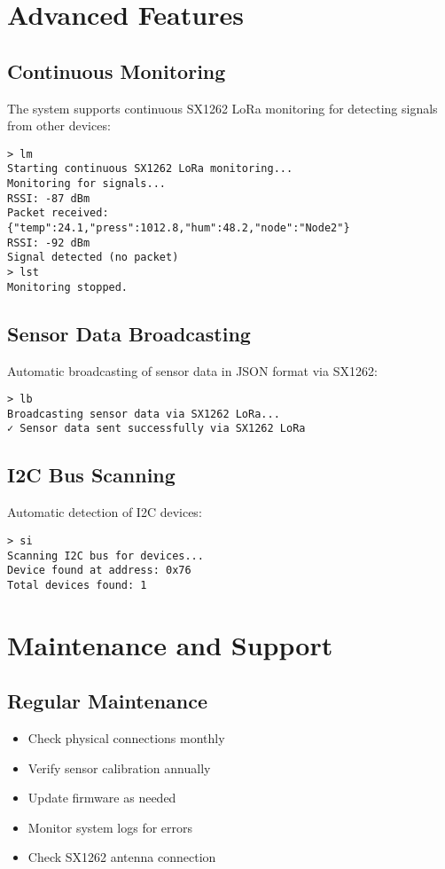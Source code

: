 \documentclass[11pt,a4paper]{article}
\begin{document}
\section{Advanced Features}

\subsection{Continuous Monitoring}
The system supports continuous SX1262 LoRa monitoring for detecting signals from other devices:

\begin{lstlisting}[caption=Continuous Monitoring]
> lm
Starting continuous SX1262 LoRa monitoring...
Monitoring for signals...
RSSI: -87 dBm
Packet received: {"temp":24.1,"press":1012.8,"hum":48.2,"node":"Node2"}
RSSI: -92 dBm
Signal detected (no packet)
> lst
Monitoring stopped.
\end{lstlisting}

\subsection{Sensor Data Broadcasting}
Automatic broadcasting of sensor data in JSON format via SX1262:

\begin{lstlisting}[caption=Sensor Data Broadcast]
> lb
Broadcasting sensor data via SX1262 LoRa...
✓ Sensor data sent successfully via SX1262 LoRa
\end{lstlisting}

\subsection{I2C Bus Scanning}
Automatic detection of I2C devices:

\begin{lstlisting}[caption=I2C Bus Scan]
> si
Scanning I2C bus for devices...
Device found at address: 0x76
Total devices found: 1
\end{lstlisting}

\section{Maintenance and Support}

\subsection{Regular Maintenance}
\begin{itemize}
    \item Check physical connections monthly
    \item Verify sensor calibration annually
    \item Update firmware as needed
    \item Monitor system logs for errors
    \item Check SX1262 antenna connection
\end{itemize}
\end{document}
